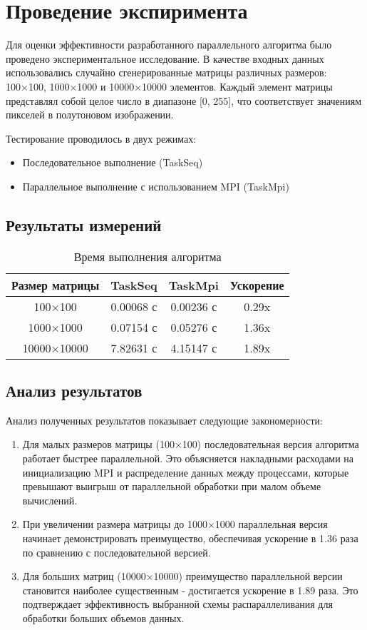 \documentclass[14pt]{extarticle}
\theoremstyle{definition}
\theoremstyle{remark}
\begin{document}
\clearpage
\section{Проведение экспиримента}

Для оценки эффективности разработанного параллельного алгоритма было проведено экспериментальное исследование. В качестве входных данных использовались случайно сгенерированные матрицы различных размеров: 100×100, 1000×1000 и 10000×10000 элементов. Каждый элемент матрицы представлял собой целое число в диапазоне [0, 255], что соответствует значениям пикселей в полутоновом изображении.

Тестирование проводилось в двух режимах:
\begin{itemize}
    \item Последовательное выполнение (TaskSeq)
    \item Параллельное выполнение с использованием MPI (TaskMpi)
\end{itemize}

\subsection{Результаты измерений}
\begin{table}[h]
\centering
\begin{tabular}{|c|c|c|c|}
\hline
\textbf{Размер матрицы} & \textbf{TaskSeq} & \textbf{TaskMpi} & \textbf{Ускорение} \\
\hline
100×100 & 0.00068 с & 0.00236 с & 0.29x \\
1000×1000 & 0.07154 с & 0.05276 с & 1.36x \\
10000×10000 & 7.82631 с & 4.15147 с & 1.89x \\
\hline
\end{tabular}
\caption{Время выполнения алгоритма}
\label{tab:execution_time}
\end{table}

\subsection{Анализ результатов}
Анализ полученных результатов показывает следующие закономерности:

\begin{enumerate}
    \item Для малых размеров матрицы (100×100) последовательная версия алгоритма работает быстрее параллельной. Это объясняется накладными расходами на инициализацию MPI и распределение данных между процессами, которые превышают выигрыш от параллельной обработки при малом объеме вычислений.
    
    \item При увеличении размера матрицы до 1000×1000 параллельная версия начинает демонстрировать преимущество, обеспечивая ускорение в 1.36 раза по сравнению с последовательной версией.
    
    \item Для больших матриц (10000×10000) преимущество параллельной версии становится наиболее существенным - достигается ускорение в 1.89 раза. Это подтверждает эффективность выбранной схемы распараллеливания для обработки больших объемов данных.
\end{enumerate}
\end{document}
